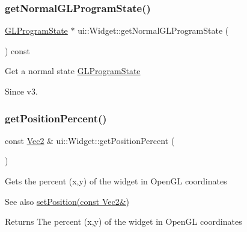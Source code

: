\subsubsection{\texorpdfstring{get\+Normal\+G\+L\+Program\+State()}{getNormalGLProgramState()}\hspace{0.1cm}{\footnotesize\ttfamily [2/2]}}
{\footnotesize\ttfamily \hyperlink{classGLProgramState}{G\+L\+Program\+State} $\ast$ ui\+::\+Widget\+::get\+Normal\+G\+L\+Program\+State (\begin{DoxyParamCaption}{ }\end{DoxyParamCaption}) const\hspace{0.3cm}{\ttfamily [protected]}}

Get a normal state \hyperlink{classGLProgramState}{G\+L\+Program\+State} \begin{DoxySince}{Since}
v3. 
\end{DoxySince}
\mbox{\label{classui_1_1Widget_a188dee36b0882a5f7790363cd0f1dea0}} 
\subsubsection{\texorpdfstring{get\+Position\+Percent()}{getPositionPercent()}\hspace{0.1cm}{\footnotesize\ttfamily [1/2]}}
{\footnotesize\ttfamily const \hyperlink{classVec2}{Vec2} \& ui\+::\+Widget\+::get\+Position\+Percent (\begin{DoxyParamCaption}{ }\end{DoxyParamCaption})}

Gets the percent (x,y) of the widget in Open\+GL coordinates

\begin{DoxySeeAlso}{See also}
\hyperlink{classui_1_1Widget_ad1983665a8a2463e77c9ff7e13fcac97}{set\+Position(const Vec2\&)}
\end{DoxySeeAlso}
\begin{DoxyReturn}{Returns}
The percent (x,y) of the widget in Open\+GL coordinates 
\end{DoxyReturn}
\mbox{\label{classui_1_1Widget_aa93b0b616c82ddb392678095bb34422b}} 
